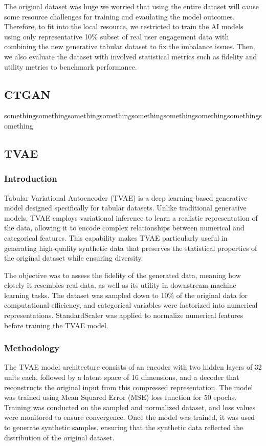 \documentclass{article}
\begin{document}
The original dataset was huge we worried that using the entire dataset will cause some resource challenges for training and evaulating the model outcomes. Therefore, to fit into the local resource, we restricted to train the AI models using only representative 10\% subset of real user engagement data with combining the new generative tabular dataset to fix the imbalance issues. Then, we also evaluate the dataset with involved statistical metrics such as fidelity and utility metrics to benchmark performance.
\subsection{CTGAN}
somethingsomethingsomethingsomethingsomethingsomethingsomethingsomethingsomething
\subsection{TVAE}
\subsubsection[short]{Introduction}

Tabular Variational Autoencoder (TVAE) is a deep learning-based generative model designed specifically for tabular datasets. Unlike traditional generative models, TVAE employs variational inference to learn a realistic representation of the data, allowing it to encode complex relationships between numerical and categorical features. This capability makes TVAE particularly useful in generating high-quality synthetic data that preserves the statistical properties of the original dataset while ensuring diversity. 

The objective was to assess the fidelity of the generated data, meaning how closely it resembles real data, as well as its utility in downstream machine learning tasks. The dataset was sampled down to 10\% of the original data for computational efficiency, and categorical variables were factorized into numerical representations. StandardScaler was applied to normalize numerical features before training the TVAE model. 

\subsubsection[short]{Methodology}

The TVAE model architecture consists of an encoder with two hidden layers of 32 units each, followed by a latent space of 16 dimensions, and a decoder that reconstructs the original input from this compressed representation. The model was trained using Mean Squared Error (MSE) loss function for 50 epochs. Training was conducted on the sampled and normalized dataset, and loss values were monitored to ensure convergence. Once the model was trained, it was used to generate synthetic samples, ensuring that the synthetic data reflected the distribution of the original dataset.
\end{document}
